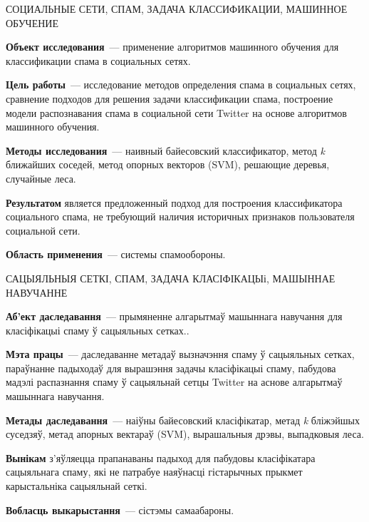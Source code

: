 
\clearpage
\begin{abstract:ru}

СОЦИАЛЬНЫЕ СЕТИ, СПАМ, ЗАДАЧА КЛАССИФИКАЦИИ, МАШИННОЕ ОБУЧЕНИЕ

\textbf{Объект исследования}~--- применение алгоритмов машинного обучения для классификации спама в социальных сетях.

\textbf{Цель работы}~--- исследование методов определения спама в социальных сетях, сравнение подходов для решения задачи классификации спама, построение модели распознавания спама в социальной сети Twitter на основе алгоритмов машинного обучения.

\textbf{Методы исследования}~--- наивный байесовский классификатор, метод \textit{k} ближайших соседей, метод опорных векторов (SVM), решающие деревья, случайные леса.

\textbf{Результатом} является предложенный подход для построения классификатора социального спама, не требующий наличия историчных признаков пользователя социальной сети.

\textbf{Область применения}~--- системы спамообороны.
\end{abstract:ru}

\pagebreak

\begin{abstract:by}

САЦЫЯЛЬНЫЯ СЕТКІ, СПАМ, ЗАДАЧА КЛАСІФІКАЦЫі, МАШЫННАЕ НАВУЧАННЕ

\textbf{Аб’ект даследавання}~--- прымяненне алгарытмаў машыннага навучання для класіфікацыі спаму ў сацыяльных сетках..

\textbf{Мэта працы}~--- даследаванне метадаў вызначэння спаму ў сацыяльных сетках, параўнанне падыходаў для вырашэння задачы класіфікацыі спаму, пабудова мадэлі распазнання спаму ў сацыяльнай сетцы Twitter на аснове алгарытмаў машыннага навучання.

\textbf{Метады даследавання}~--- наіўны байесовский класіфікатар, метад \textit{k} бліжэйшых суседзяў, метад апорных вектараў (SVM), вырашальныя дрэвы, выпадковыя леса.

\textbf{Вынікам} з'яўляецца прапанаваны падыход для пабудовы класіфікатара сацыяльнага спаму, які не патрабуе наяўнасці гістарычных прыкмет карыстальніка сацыяльнай сеткі.

\textbf{Вобласць выкарыстання}~--- сістэмы самаабароны.
\end{abstract:by}

